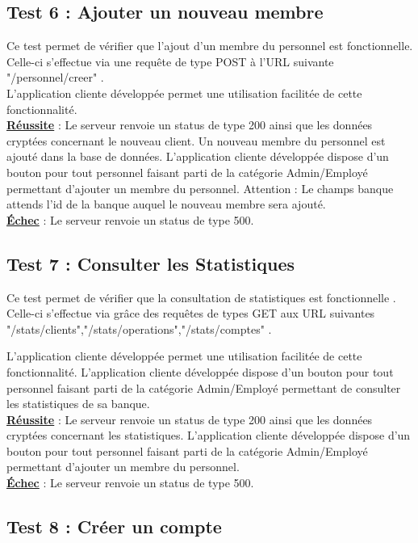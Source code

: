 \subsection{Test 6 : Ajouter un nouveau membre}

Ce test permet de vérifier que l'ajout d'un membre du personnel est fonctionnelle.
Celle-ci s'effectue via une requête de type POST à l'URL suivante "/personnel/creer" .
\\
L'application cliente développée permet une utilisation facilitée de cette fonctionnalité. 
\\
\textbf{\underline{Réussite}} : Le serveur renvoie un status de type 200 ainsi que les données cryptées concernant le nouveau client. Un nouveau membre du personnel est ajouté dans la base de données.
L'application cliente développée dispose d'un bouton pour tout personnel faisant parti de la catégorie Admin/Employé permettant d'ajouter un membre du personnel.
Attention : Le champs banque attends l'id de la banque auquel le nouveau membre sera ajouté.
\\
\textbf{\underline{Échec}} : Le serveur renvoie un status de type 500.

\subsection{Test 7 : Consulter les Statistiques}
Ce test permet de vérifier que la consultation de statistiques est fonctionnelle .
Celle-ci s'effectue via grâce des requêtes de types GET aux URL suivantes "/stats/clients","/stats/operations","/stats/comptes" .

L'application cliente développée permet une utilisation facilitée de cette fonctionnalité. 
L'application cliente développée dispose d'un bouton pour tout personnel faisant parti de la catégorie Admin/Employé permettant de consulter les statistiques de sa banque.
\\
\textbf{\underline{Réussite}} : Le serveur renvoie un status de type 200 ainsi que les données cryptées concernant les statistiques.
L'application cliente développée dispose d'un bouton pour tout personnel faisant parti de la catégorie Admin/Employé permettant d'ajouter un membre du personnel.
\\
\textbf{\underline{Échec}} : Le serveur renvoie un status de type 500.

\subsection{Test 8 : Créer un compte }

